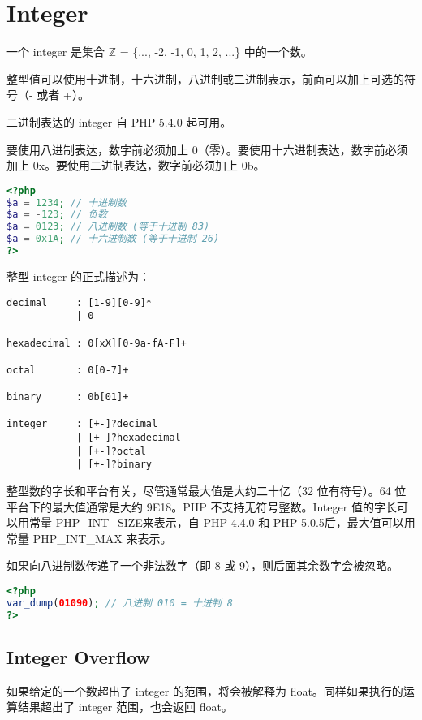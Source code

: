 \section{Integer}

一个 integer 是集合 $\mathbb{Z}$ = \{..., -2, -1, 0, 1, 2, ...\} 中的一个数。

整型值可以使用十进制，十六进制，八进制或二进制表示，前面可以加上可选的符号（- 或者 +）。

二进制表达的 integer 自 PHP 5.4.0 起可用。

要使用八进制表达，数字前必须加上 0（零）。要使用十六进制表达，数字前必须加上 0x。要使用二进制表达，数字前必须加上 0b。

\begin{lstlisting}[language=PHP]
<?php
$a = 1234; // 十进制数
$a = -123; // 负数
$a = 0123; // 八进制数 (等于十进制 83)
$a = 0x1A; // 十六进制数 (等于十进制 26)
?>
\end{lstlisting}


整型 integer 的正式描述为：

\begin{verbatim}
decimal     : [1-9][0-9]*
            | 0

hexadecimal : 0[xX][0-9a-fA-F]+

octal       : 0[0-7]+

binary      : 0b[01]+

integer     : [+-]?decimal
            | [+-]?hexadecimal
            | [+-]?octal
            | [+-]?binary
\end{verbatim}


整型数的字长和平台有关，尽管通常最大值是大约二十亿（32 位有符号）。64 位平台下的最大值通常是大约 9E18。PHP 不支持无符号整数。Integer 值的字长可以用常量 PHP\_INT\_SIZE来表示，自 PHP 4.4.0 和 PHP 5.0.5后，最大值可以用常量 PHP\_INT\_MAX 来表示。


如果向八进制数传递了一个非法数字（即 8 或 9），则后面其余数字会被忽略。

\begin{lstlisting}[language=PHP]
<?php
var_dump(01090); // 八进制 010 = 十进制 8
?>
\end{lstlisting}

\subsection{Integer Overflow}


如果给定的一个数超出了 integer 的范围，将会被解释为 float。同样如果执行的运算结果超出了 integer 范围，也会返回 float。

